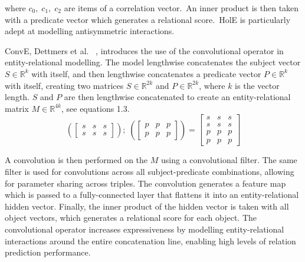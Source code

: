 \noindent where $ c_0, \; c_1, \; c_2 $ are items of a correlation vector.\ An inner product is then taken with a predicate vector which generates a relational score.\ HolE is particularly adept at modelling antisymmetric interactions. \par

\noindent ConvE, Dettmers et al. \unskip~\citep{dettmers2018convolutional}, introduces the use of the convolutional operator in entity-relational modelling. The model lengthwise concatenates the subject vector $ S \in \mathbb{R}^{k} $ with itself, and then lengthwise concatenates a predicate vector $ P \in \mathbb{R}^{k} $ with itself, creating two matrices $ S \in \mathbb{R}^{2k} $ and $ P \in \mathbb{R}^{2k} $, where $ k $  is the vector length. $ S $ and $ P $ are then lengthwise concatenated to create an entity-relational matrix $ M \in \mathbb{R}^{4k} $, see equations 1.3.
\begin{equation}
	(\begin{bmatrix}
        		s & s & s \\
           	s & s & s 
       	\end{bmatrix}); \; (\begin{bmatrix}
        					p & p & p \\
           				p & p & p 
       				\end{bmatrix}) = \begin{bmatrix}
        								s & s & s \\
           							s & s & s \\
           							p & p & p \\
           							p & p & p
        			     				\end{bmatrix}
\end{equation}

\noindent A convolution is then performed on the $ M $ using a convolutional filter. The same filter is used for convolutions across all subject-predicate combinations, allowing for parameter sharing across triples. The convolution generates a feature map which is passed to a fully-connected layer that flattens it into an entity-relational hidden vector. Finally, the inner product of the hidden vector is taken with all object vectors, which generates a relational score for each object. The convolutional operator increases expressiveness by modelling entity-relational interactions around the entire concatenation line, enabling high levels of relation prediction performance. \par


